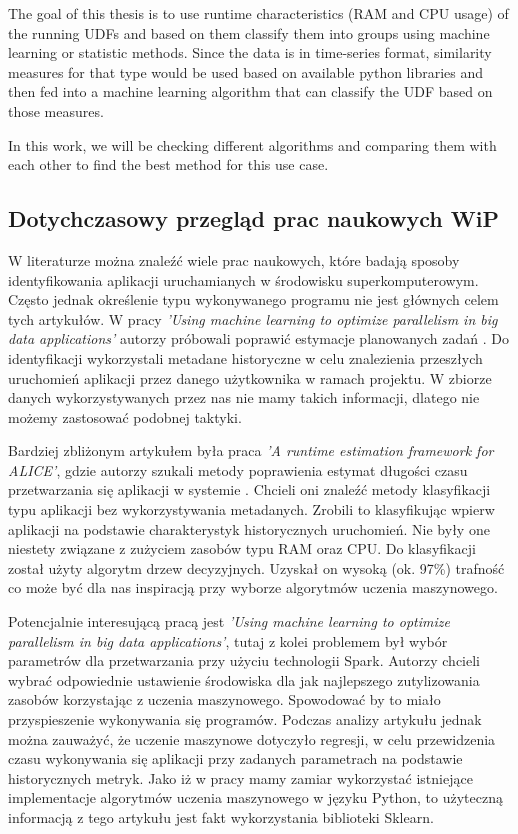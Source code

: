 The goal of this thesis is to use runtime characteristics (RAM and CPU usage) of the running UDFs and based on them classify them into groups using machine learning or statistic methods.
Since the data is in time-series format, similarity measures for that type would be used based on available python libraries and then fed into a machine learning algorithm that can classify the UDF based on those measures.

In this work, we will be checking different algorithms and comparing them with each other to find the best method for this use case.

\subsection{Dotychczasowy przegląd prac naukowych WiP}
W literaturze można znaleźć wiele prac naukowych, które badają sposoby identyfikowania aplikacji uruchamianych w środowisku superkomputerowym. Często jednak określenie typu wykonywanego programu nie jest głównych celem tych artykułów. W pracy \textit{'Using machine learning to optimize parallelism in big data applications'} autorzy próbowali poprawić estymacje planowanych zadań \cite{JobSchedulingSC}. Do identyfikacji wykorzystali metadane historyczne w celu znalezienia przeszłych uruchomień aplikacji przez danego użytkownika w ramach projektu. W zbiorze danych wykorzystywanych przez nas nie mamy takich informacji, dlatego nie możemy zastosować podobnej taktyki. 

Bardziej zbliżonym artykułem była praca \textit{'A runtime estimation framework for ALICE'}, gdzie autorzy szukali metody poprawienia estymat długości czasu przetwarzania się aplikacji w systemie \cite{RuntimeEstimationALICE}. Chcieli oni znaleźć metody klasyfikacji typu aplikacji bez wykorzystywania metadanych. Zrobili to klasyfikując wpierw aplikacji na podstawie charakterystyk historycznych uruchomień. Nie były one niestety związane z zużyciem zasobów typu RAM oraz CPU. Do klasyfikacji został użyty algorytm drzew decyzyjnych. Uzyskał on wysoką (ok. 97\%) trafność co może być dla nas inspiracją przy wyborze algorytmów uczenia maszynowego.

Potencjalnie interesującą pracą jest \textit{'Using machine learning to optimize parallelism in big data applications'}\cite{BigDataParallelism}, tutaj z kolei problemem był wybór parametrów dla przetwarzania przy użyciu technologii Spark. Autorzy chcieli wybrać odpowiednie ustawienie środowiska dla jak najlepszego zutylizowania zasobów korzystając z uczenia maszynowego. Spowodować by to miało przyspieszenie wykonywania się programów. Podczas analizy artykułu jednak można zauważyć, że uczenie maszynowe dotyczyło regresji, w celu przewidzenia czasu wykonywania się aplikacji przy zadanych parametrach na podstawie historycznych metryk. Jako iż w pracy mamy zamiar wykorzystać istniejące implementacje algorytmów uczenia maszynowego w języku Python, to użyteczną informacją z tego artykułu jest fakt wykorzystania biblioteki Sklearn. 


